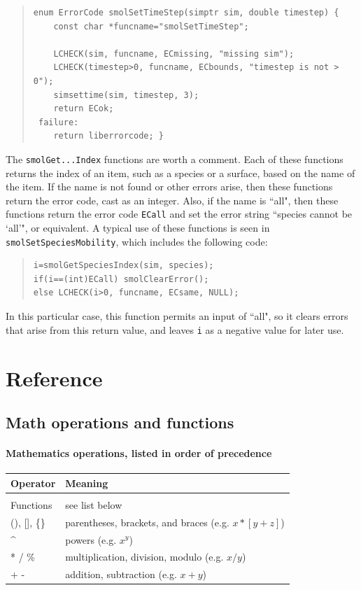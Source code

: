 \documentclass {scrbook}
\newcommand {\ttt} {\texttt}
\begin{document}
\begin{quote}
\begin{lstlisting}[style=SSAC]
enum ErrorCode smolSetTimeStep(simptr sim, double timestep) {
	const char *funcname="smolSetTimeStep";

	LCHECK(sim, funcname, ECmissing, "missing sim");
	LCHECK(timestep>0, funcname, ECbounds, "timestep is not > 0");
	simsettime(sim, timestep, 3);
	return ECok;
 failure:
	return liberrorcode; }
\end{lstlisting}
\end{quote}

The \ttt{smolGet...Index} functions are worth a comment. Each of these functions returns the index of an item, such as a species or a surface, based on the name of the item. If the name is not found or other errors arise, then these functions return the error code, cast as an integer. Also, if the name is ``all", then these functions return the error code \ttt{ECall} and set the error string ``species cannot be `all'", or equivalent. A typical use of these functions is seen in \ttt{smolSetSpeciesMobility}, which includes the following code:

\begin{quote}
\begin{lstlisting}[style=SSAC]
i=smolGetSpeciesIndex(sim, species);
if(i==(int)ECall) smolClearError();
else LCHECK(i>0, funcname, ECsame, NULL);
\end{lstlisting}
\end{quote}

In this particular case, this function permits an input of ``all", so it clears errors that arise from this return value, and leaves \ttt{i} as a negative value for later use.

\part{Reference}

\chapter{Math operations and functions}

\subsection*{Mathematics operations, listed in order of precedence}

\begin{longtable}[c]{ll}
Operator & Meaning\\
\hline \\
Functions & see list below\\
(), [], \{\} & parentheses, brackets, and braces (e.g. $x*[y+z]$)\\
\^{} & powers (e.g. $x^y$)\\
* / \% & multiplication, division, modulo (e.g. $x/y$)\\
+ - & addition, subtraction (e.g. $x+y$)
\end{longtable}
\end{document}
